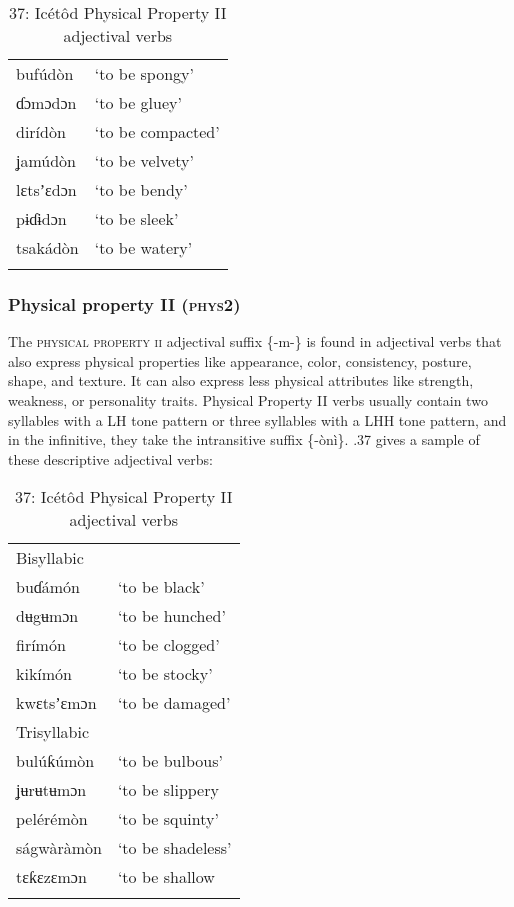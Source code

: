 \begin{table}
\begin{table}
\caption{36: Icétôd Physical Property I adjectival verbs}
\label{tab:8}


\begin{tabularx}{\textwidth}{XX}
\lsptoprule

bufúdòn & ‘to be spongy’\\
ɗɔmɔdɔn & ‘to be gluey’\\
dirídòn & ‘to be compacted’\\
ʝamúdòn & ‘to be velvety’\\
lɛtsʼɛdɔn & ‘to be bendy’\\
pɨɗɨdɔn & ‘to be sleek’\\
tsakádòn & ‘to be watery’\\
\lspbottomrule
\end{tabularx}
\end{table}

\subsubsection{Physical property II (\textsc{phys2})}

The \textsc{physical property ii }adjectival suffix \{-m-\} is found in adjectival verbs that also express physical properties like appearance, color, consistency, posture, shape, and texture. It can also express less physical attributes like strength, weakness, or personality traits. Physical Property II verbs usually contain two syllables with a LH tone pattern or three syllables with a LHH tone pattern, and in the infinitive, they take the intransitive suffix \{-ònì\}. .37 gives a sample of these descriptive adjectival verbs:


\begin{table}
\caption{37: Icétôd Physical Property II adjectival verbs}
\label{tab:8}


\begin{tabularx}{\textwidth}{XX}
\lsptoprule

Bisyllabic & \\
buɗámón & ‘to be black’\\
dʉgʉmɔn & ‘to be hunched’\\
firímón & ‘to be clogged’\\
kikímón & ‘to be stocky’\\
kwɛtsʼɛmɔn & ‘to be damaged’\\
Trisyllabic & \\
bulúƙúmòn & ‘to be bulbous’\\
ʝʉrʉtʉmɔn & ‘to be slippery\\
pelérémòn & ‘to be squinty’\\
ságwàràmòn & ‘to be shadeless’\\
tɛƙɛzɛmɔn & ‘to be shallow\\
\lspbottomrule
\end{tabularx}
\end{table}


\end{table}
